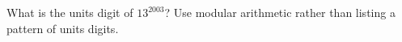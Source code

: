 What is the units digit of $13^{2003}$? Use modular arithmetic rather than listing a pattern of units digits.
